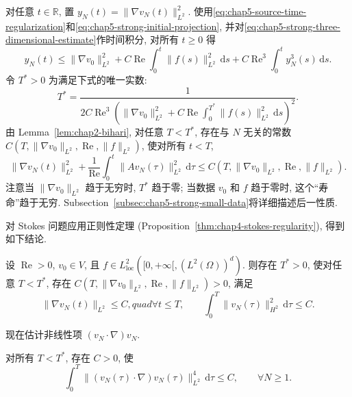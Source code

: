 对任意 $t\in\mathbb R$, 置 $y_N(t)=\|\nabla v_N(t)\|_{L^2}^2$. 使用\eqref{eq:chap5-source-time-regularization}和\eqref{eq:chap5-strong-initial-projection}, 并对\eqref{eq:chap5-strong-three-dimensional-estimate}作时间积分, 对所有 $t\geq0$ 得
\[
 y_N(t)\leq\|\nabla v_0\|_{L^2}^2
 +C\operatorname{Re}\int_0^t\|f(s)\|_{L^2}^2\,\mathrm ds
 +C\operatorname{Re}^3\int_0^ty_N^3(s)\,\mathrm ds.
\]
令 $T^*>0$ 为满足下式的唯一实数:
\begin{equation}
 T^*=\frac1{2C\operatorname{Re}^3
 \left(\|\nabla v_0\|_{L^2}^2
 +C\operatorname{Re}\int_0^{T^*}\|f(s)\|_{L^2}^2\,\mathrm ds\right)^2}.
\label{eq:chap5-strong-lifetime}
\end{equation}
由 Lemma~\ref{lem:chap2-bihari}, 对任意 $T<T^*$, 存在与 $N$ 无关的常数 $C(T,\|\nabla v_0\|_{L^2},\operatorname{Re},\|f\|_{L^2})$, 使对所有 $t<T$,
\[
 \|\nabla v_N(t)\|_{L^2}^2
 +\frac1{\operatorname{Re}}\int_0^t\|Av_N(\tau)\|_{L^2}^2\,\mathrm d\tau
 \leq C(T,\|\nabla v_0\|_{L^2},\operatorname{Re},\|f\|_{L^2}).
\]
注意当 $\|\nabla v_0\|_{L^2}$ 趋于无穷时, $T^*$ 趋于零; 当数据 $v_0$ 和 $f$ 趋于零时, 这个``寿命''趋于无穷. Subsection~\ref{subsec:chap5-strong-small-data}将详细描述后一性质.

对 Stokes 问题应用正则性定理 (Proposition~\ref{thm:chap4-stokes-regularity}), 得到如下结论.

\begin{Proposition}
\label{prop:chap5-strong-three-dimensional-galerkin-bounds}
设 $\operatorname{Re}>0$, $v_0\in V$, 且 $f\in L_{\mathrm{loc}}^2([0,+\infty[,(L^2(\Omega))^d)$. 则存在 $T^*>0$, 使对任意 $T<T^*$, 存在 $C(T,\|\nabla v_0\|_{L^2},\operatorname{Re},\|f\|_{L^2})>0$, 满足
\begin{equation}
 \|\nabla v_N(t)\|_{L^2}\leq C,quad\forall t\leq T,
 \qquad
 \int_0^T\|v_N(\tau)\|_{H^2}^2\,\mathrm d\tau\leq C.
\label{eq:chap5-strong-three-dimensional-h2-bounds}
\end{equation}
\end{Proposition}

现在估计非线性项 $(v_N\cdot\nabla)v_N$.

\begin{Proposition}
\label{prop:chap5-strong-nonlinear-l2-bound}
对所有 $T<T^*$, 存在 $C>0$, 使
\begin{equation}
 \int_0^T\|(v_N(\tau)\cdot\nabla)v_N(\tau)\|_{L^2}^4\,\mathrm d\tau
 \leq C,
 \qquad\forall N\geq1.
\label{eq:chap5-strong-nonlinear-fourth-power}
\end{equation}
\end{Proposition}

